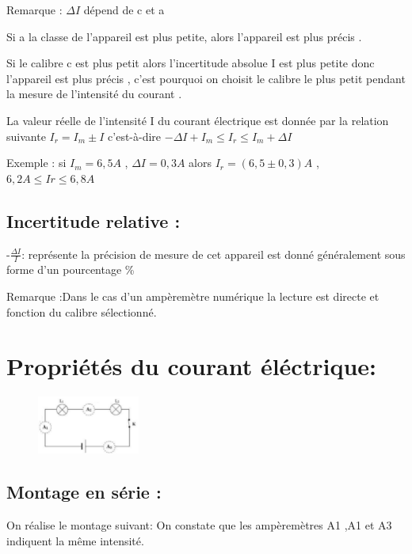 \documentclass[12pt]{article}
\begin{document}
\begin{tcolorbox}
 Remarque : 
    $\Delta{I}$ dépend de c et a

Si a la classe de l’appareil est plus petite, alors l’appareil est plus précis .

Si le calibre c est plus petit alors l’incertitude absolue I est plus petite donc l’appareil est plus précis , c’est pourquoi on choisit le calibre le plus petit pendant la mesure de l’intensité du courant .

    La valeur réelle de l’intensité I du courant électrique est donnée par la relation suivante $I_r = I_m \pm I$ c’est-à-dire   $-\Delta{I} + I_m\leq  I_r \leq I_m  + \Delta{I}$


    Exemple : si $I_m = 6,5 A$ , $\Delta{I} = 0,3 A$ alors $I_r = ( 6,5 \pm 0,3 ) A$ ,$ 6,2 A \leq Ir \leq 6,8 A$

    \subsection{Incertitude relative :}
    -$\frac{\Delta{I}}{I} $: représente la précision de mesure de cet appareil
    est donné généralement sous forme d’un pourcentage \%

Remarque :Dans le cas d'un ampèremètre numérique la lecture est directe et fonction du calibre sélectionné.

\end{tcolorbox}

\section{Propriétés du courant éléctrique:}

\begin{figure}
    \vspace{-3cm}
\includegraphics[width=0.3\textwidth]{./img/img_05.png}
\end{figure}


\subsection{Montage en série :}
On réalise le montage suivant:
On constate que les ampèremètres A1 ,A1 et A3 indiquent la même intensité.
\end{document}
